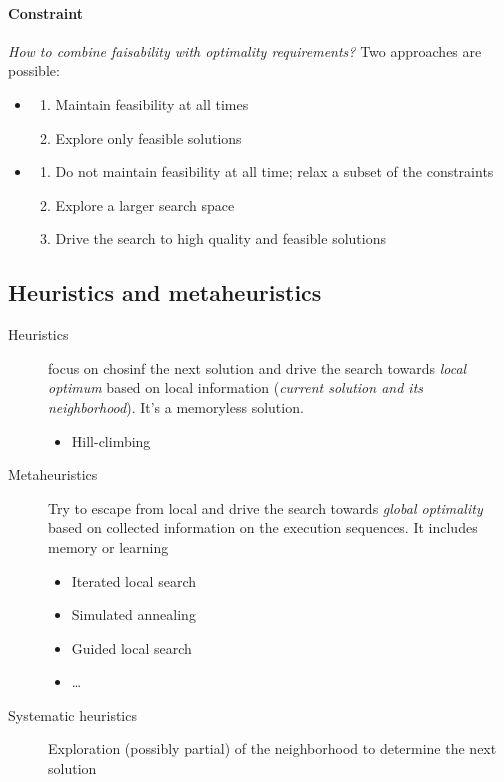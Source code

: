 \paragraph{Constraint}

\textit{How to combine faisability with optimality requirements?} Two approaches are possible:
\begin{itemize}
\item
	\begin{enumerate}
	\item Maintain feasibility at all times
	\item Explore only feasible solutions
	\end{enumerate}
\item 
	\begin{enumerate}
	\item Do not maintain feasibility at all time; relax a subset of the constraints
	\item Explore a larger search space
	\item Drive the search to high quality and feasible solutions
	\end{enumerate}
\end{itemize}

\subsection{Heuristics and metaheuristics}

\begin{description}

    \item[Heuristics] focus on  chosinf the next solution  and drive the
    search  towards \textit{local  optimum} based  on local  information
    (\textit{current solution and its  neighborhood}). It's a memoryless
    solution.

        \begin{itemize}
            \item Hill-climbing
            \end{itemize}

    \item[Metaheuristics] Try to escape from  local and drive the search
    towards  \textit{global optimality}  based on  collected information
    on  the   execution  sequences.  It  includes   memory  or  learning

        \begin{itemize}
            \item Iterated local search
            \item Simulated annealing
            \item Guided local search
            \item \ldots
            \end{itemize}

    \item[Systematic heuristics]  Exploration (possibly partial)  of the
neighborhood to determine the next solution

\end{description}

